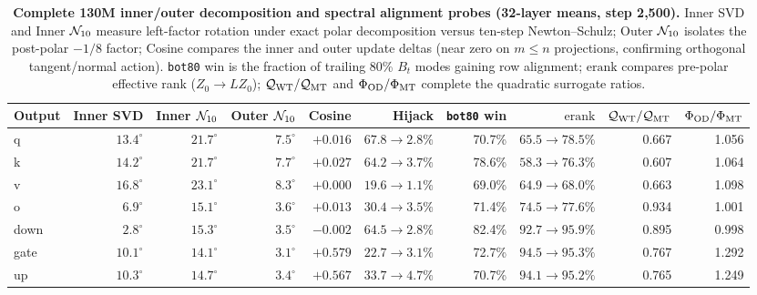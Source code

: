 \begin{table}[tbp]\centering\footnotesize
\setlength{\tabcolsep}{3.2pt}
\caption{\textbf{Complete 130M inner/outer decomposition and spectral alignment probes (32-layer means, step 2,500).} Inner SVD and Inner $\mathcal{N}_{10}$ measure left-factor rotation under exact polar decomposition versus ten-step Newton--Schulz; Outer $\mathcal{N}_{10}$ isolates the post-polar $-1/8$ factor; Cosine compares the inner and outer update deltas (near zero on $m\le n$ projections, confirming orthogonal tangent/normal action). \texttt{bot80} win is the fraction of trailing 80\% $B_t$ modes gaining row alignment; $\mathrm{erank}$ compares pre-polar effective rank ($Z_0\to L Z_0$); $\mathcal Q_{\rm WT}/\mathcal Q_{\rm MT}$ and $\Phi_{\rm OD}/\Phi_{\rm MT}$ complete the quadratic surrogate ratios.}\label{tab:rotation_detail}
\begin{tabularx}{\textwidth}{@{}>{\raggedright\arraybackslash}Xrrrrrrrrr@{}}
\toprule
Output & Inner SVD & Inner $\mathcal{N}_{10}$ & Outer $\mathcal{N}_{10}$ & Cosine & Hijack & \texttt{bot80} win & $\mathrm{erank}$ & $\mathcal Q_{\rm WT}/\mathcal Q_{\rm MT}$ & $\Phi_{\rm OD}/\Phi_{\rm MT}$ \\
\midrule
q & $13.4^\circ$ & $21.7^\circ$ & $7.5^\circ$ & $+0.016$ & $67.8\to2.8\%$ & 70.7\% & $65.5\to78.5\%$ & 0.667 & 1.056 \\
k & $14.2^\circ$ & $21.7^\circ$ & $7.7^\circ$ & $+0.027$ & $64.2\to3.7\%$ & 78.6\% & $58.3\to76.3\%$ & 0.607 & 1.064 \\
v & $16.8^\circ$ & $23.1^\circ$ & $8.3^\circ$ & $+0.000$ & $19.6\to1.1\%$ & 69.0\% & $64.9\to68.0\%$ & 0.663 & 1.098 \\
o & $6.9^\circ$ & $15.1^\circ$ & $3.6^\circ$ & $+0.013$ & $30.4\to3.5\%$ & 71.4\% & $74.5\to77.6\%$ & 0.934 & 1.001 \\
down & $2.8^\circ$ & $15.3^\circ$ & $3.5^\circ$ & $-0.002$ & $64.5\to2.8\%$ & 82.4\% & $92.7\to95.9\%$ & 0.895 & 0.998 \\
gate & $10.1^\circ$ & $14.1^\circ$ & $3.1^\circ$ & $+0.579$ & $22.7\to3.1\%$ & 72.7\% & $94.5\to95.3\%$ & 0.767 & 1.292 \\
up & $10.3^\circ$ & $14.7^\circ$ & $3.4^\circ$ & $+0.567$ & $33.7\to4.7\%$ & 70.7\% & $94.1\to95.2\%$ & 0.765 & 1.249 \\
\bottomrule\end{tabularx}
\end{table}

